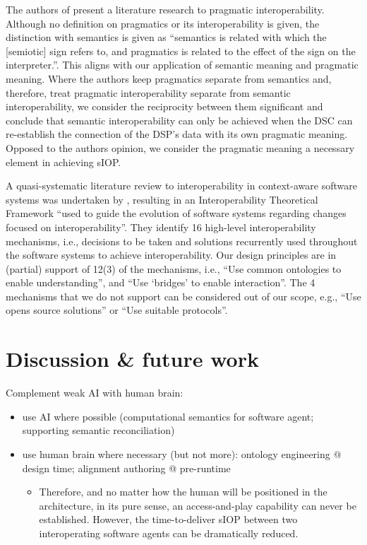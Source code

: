 \documentclass[sort&compress,preprint,authoryear,3p,twocolumn]{elsarticle}
\providecommand{\tightlist}{%
  \setlength{\itemsep}{0pt}\setlength{\parskip}{0pt}}
\begin{document}
The authors of \citep{Neiva2016} present a literature research to
pragmatic interoperability. Although no definition on pragmatics or its
interoperability is given, the distinction with semantics is given as
``semantics is related with which the {[}semiotic{]} sign refers to, and
pragmatics is related to the effect of the sign on the interpreter.''.
This aligns with our application of semantic meaning and pragmatic
meaning. Where the authors keep pragmatics separate from semantics and,
therefore, treat pragmatic interoperability separate from semantic
interoperability, we consider the reciprocity between them significant
and conclude that semantic interoperability can only be achieved when
the DSC can re-establish the connection of the DSP's data with its own
pragmatic meaning. Opposed to the authors opinion, we consider the
pragmatic meaning a necessary element in achieving sIOP.

A quasi-systematic literature review to interoperability in
context-aware software systems was undertaken by \citep{Motta2019},
resulting in an Interoperability Theoretical Framework ``used to guide
the evolution of software systems regarding changes focused on
interoperability''. They identify 16 high-level interoperability
mechanisms, i.e., decisions to be taken and solutions recurrently used
throughout the software systems to achieve interoperability. Our design
principles are in (partial) support of 12(3) of the mechanisms, i.e.,
``Use common ontologies to enable understanding'', and ``Use `bridges'
to enable interaction''. The 4 mechanisms that we do not support can be
considered out of our scope, e.g., ``Use opens source solutions'' or
``Use suitable protocols''.

\hypertarget{discussion-future-work}{%
\section{Discussion \& future work}\label{discussion-future-work}}

Complement weak AI with human brain:

\begin{itemize}
\tightlist
\item
  use AI where possible (computational semantics for software agent;
  supporting semantic reconciliation)
\item
  use human brain where necessary (but not more): ontology engineering @
  design time; alignment authoring @ pre-runtime

  \begin{itemize}
  \tightlist
  \item
    Therefore, and no matter how the human will be positioned in the
    architecture, in its pure sense, an access-and-play capability can
    never be established. However, the time-to-deliver sIOP between two
    interoperating software agents can be dramatically reduced.
  \end{itemize}
\end{itemize}
\end{document}

